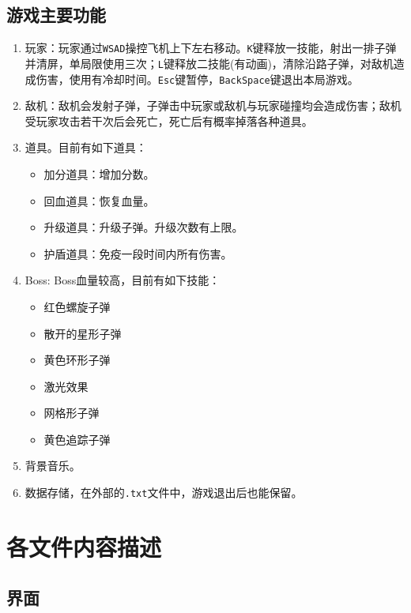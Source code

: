 \documentclass[UTF8,12pt]{ctexart}
\begin{document}
	    \subsection{游戏主要功能}
	        \begin{enumerate}[nosep,label={\arabic*°: }]
	            \item 玩家：玩家通过\texttt{WSAD}操控飞机上下左右移动。\texttt{K}键释放一技能，射出一排子弹并清屏，单局限使用三次；\texttt{L}键释放二技能(有动画)，清除沿路子弹，对敌机造成伤害，使用有冷却时间。\texttt{Esc}键暂停，\texttt{BackSpace}键退出本局游戏。
	            \item 敌机：敌机会发射子弹，子弹击中玩家或敌机与玩家碰撞均会造成伤害；敌机受玩家攻击若干次后会死亡，死亡后有概率掉落各种道具。
	            \item 道具。目前有如下道具：
	                \begin{itemize}[nosep]
	                    \item 加分道具：增加分数。
	                    \item 回血道具：恢复血量。
	                    \item 升级道具：升级子弹。升级次数有上限。
	                    \item 护盾道具：免疫一段时间内所有伤害。
	                \end{itemize}
	            \item Boss: Boss血量较高，目前有如下技能：
	                \begin{itemize}[nosep]
	                    \item 红色螺旋子弹
	                    \item 散开的星形子弹
	                    \item 黄色环形子弹
	                    \item 激光效果
	                    \item 网格形子弹
	                    \item 黄色追踪子弹
	                \end{itemize}
	            \item 背景音乐。
	            \item 数据存储，在外部的\texttt{.txt}文件中，游戏退出后也能保留。
	        \end{enumerate}

    \section{各文件内容描述}
	    \subsection{界面}
\end{document}
